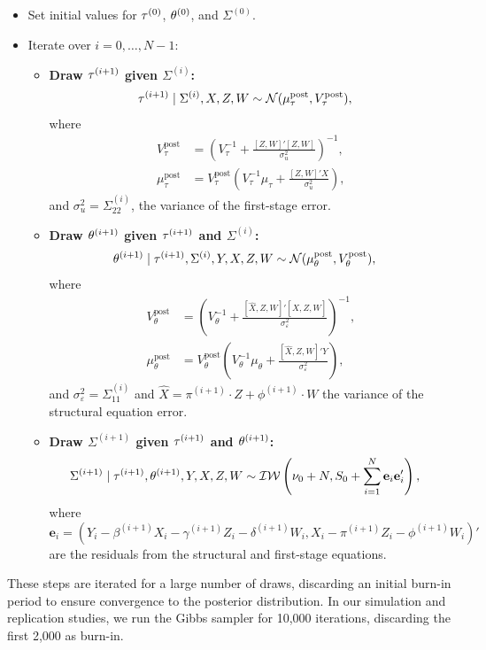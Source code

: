 \begin{itemize}
    \item Set initial values for $\mathbf{\tau}^{(0)}$, $\mathbf{\theta}^{(0)}$, and $\Sigma^{(0)}$.
    \item Iterate over $i = 0, \ldots, N-1$:
    \begin{itemize}
    \item \textbf{Draw $\mathbf{\tau}^{(i+1)}$ given $\Sigma^{(i)}$:} 
    \begin{align*}
        \mathbf{\tau}^{(i+1)} \mid \Sigma^{(i)}, X, Z, W &\sim \mathcal{N}(\mu_{\tau}^{\text{post}}, V_{\tau}^{\text{post}}),
    \end{align*}
    where
    \begin{align*}
        V_{\tau}^{\text{post}} &= \left( V_{\tau}^{-1} + \frac{[Z,W]'[Z,W]}{\sigma_u^2} \right)^{-1}, \\
        \mu_{\tau}^{\text{post}} &= V_{\tau}^{\text{post}} \left( V_{\tau}^{-1}\mu_{\tau} + \frac{[Z,W]'X}{\sigma_u^2} \right),
    \end{align*}
    and $\sigma_u^2 = \Sigma_{22}^{(i)}$, the variance of the first-stage error.

    \item \textbf{Draw $\mathbf{\theta}^{(i+1)}$ given $\mathbf{\tau}^{(i+1)}$ and $\Sigma^{(i)}$:}
    \begin{align*}
        \mathbf{\theta}^{(i+1)} \mid \mathbf{\tau}^{(i+1)}, \Sigma^{(i)}, Y, X, Z, W &\sim \mathcal{N}(\mu_{\theta}^{\text{post}}, V_{\theta}^{\text{post}}),
    \end{align*}
    where
    \begin{align*}
        V_{\theta}^{\text{post}} &= \left( V_{\theta}^{-1} + \frac{[\hat{X},Z,W]'[\hat{X},Z,W]}{\sigma_\varepsilon^2} \right)^{-1}, \\
        \mu_{\theta}^{\text{post}} &= V_{\theta}^{\text{post}} \left( V_{\theta}^{-1}\mu_{\theta} + \frac{[\hat{X},Z,W]'Y}{\sigma_\varepsilon^2} \right),
    \end{align*}
    and $\sigma_\varepsilon^2 = \Sigma_{11}^{(i)}$ and $\hat{X}=\pi^{(i+1)}\cdot Z + \phi^{(i+1)}\cdot W$ the variance of the structural equation error.

    \item \textbf{Draw $\Sigma^{(i+1)}$ given $\mathbf{\tau}^{(i+1)}$ and $\mathbf{\theta}^{(i+1)}$:}
    \begin{align*}
        \Sigma^{(i+1)} \mid \mathbf{\tau}^{(i+1)}, \mathbf{\theta}^{(i+1)}, Y, X, Z, W &\sim \mathcal{IW}\left( \nu_0 + N, S_0 + \sum_{i=1}^N \mathbf{e}_i \mathbf{e}_i' \right),
    \end{align*}
    where $\mathbf{e}_i = (Y_i - \beta^{(i+1)} X_i - \gamma^{(i+1)} Z_i - \delta^{(i+1)} W_i, X_i - \pi^{(i+1)} Z_i - \phi^{(i+1)} W_i)'$ are the residuals from the structural and first-stage equations.
\end{itemize}
\end{itemize}

These steps are iterated for a large number of draws, discarding an initial burn-in period to ensure convergence to the posterior distribution. In our simulation and replication studies, we run the Gibbs sampler for 10,000 iterations, discarding the first 2,000 as burn-in.
